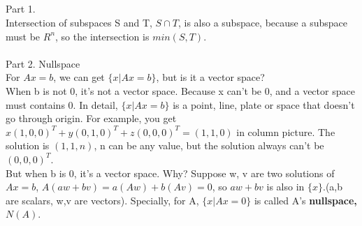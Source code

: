 \documentclass{article}
\begin{document}
\begin{spacing}{1.5}
\section{}
Part 1. \\
Intersection of subspaces S and T, $S \cap T$, is also a subspace, because a subspace must be $R^n$, so the intersection is $min(S, T)$. \\
\\ Part 2. Nullspace \\
For $Ax=b$, we can get $\{x|Ax=b\}$, but is it a vector space? \\
When b is not 0, it's not a vector space. Because x can't be 0, and a vector space must contains 0. In detail, $\{x|Ax=b\}$ is a point, line, plate or space that doesn't go through origin. For example, you get $x(1, 0, 0)^T+y(0, 1, 0)^T+z(0, 0, 0)^T=(1, 1, 0)$ in column picture. The solution is $(1, 1, n)$, n can be any value, but the solution always can't be $(0, 0, 0)^T$.\\
But when b is 0, it's a vector space. Why? Suppose w, v are two solutions of $Ax=b$, $A(aw+bv)=a(Aw)+b(Av)=0$, so $aw+bv$ is also in $\{x\}$.(a,b are scalars, w,v are vectors). Specially, for A, $\{x|Ax=0\}$ is called A's {\bfseries nullspace, $N(A)$}.


\end{spacing}
\end{document}
